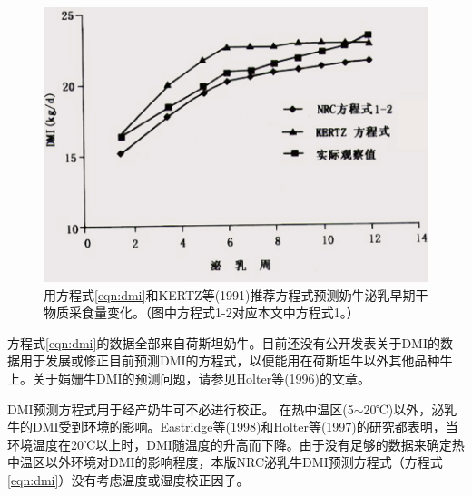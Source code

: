\begin{figure}
\begin{center}
	\includegraphics[width=0.9\linewidth]{dmi}
\caption{用方程式\ref{eqn:dmi}和KERTZ等(1991)推荐方程式预测奶牛泌乳早期干物质采食量变化。（图中方程式1-2对应本文中方程式1。）}
\label{fig:dmi}
\end{center}
\end{figure}

方程式\ref{eqn:dmi}的数据全部来自荷斯坦奶牛。目前还没有公开发表关于DMI的数据用于发展或修正目前预测DMI的方程式，以便能用在荷斯坦牛以外其他品种牛上。关于娟姗牛DMI的预测问题，请参见Holter等(1996)的文章。

DMI预测方程式用于经产奶牛可不必进行校正。
在热中温区(5$\sim$20℃)以外，泌乳牛的DMI受到环境的影响。Eastridge等(1998)和Holter等(1997)的研究都表明，当环境温度在20℃以上时，DMI随温度的升高而下降。由于没有足够的数据来确定热中温区以外环境对DMI的影响程度，本版NRC泌乳牛DMI预测方程式（方程式\ref{eqn:dmi}）没有考虑温度或湿度校正因子。\documentclass[UTF8,a4paper,10pt, twocolumn]{ctexart}
\usepackage[left=2.50cm, right=2.50cm, top=2.50cm, bottom=2.50cm]{geometry}



\usepackage{times}

\usepackage{amsmath, amsfonts, amssymb} %
\usepackage[english]{babel}
\usepackage{color}      %
\usepackage{graphicx}   %
\usepackage{url}        %
\usepackage{bm}         %
\usepackage{multirow}
\usepackage{booktabs}
\usepackage{epstopdf}
\usepackage{epsfig}
\usepackage{algorithm}
\usepackage{algorithmic}
\usepackage{diagbox}



